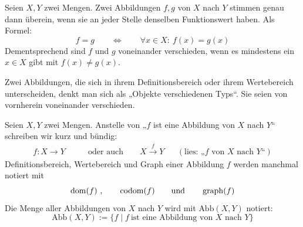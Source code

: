 \begin{axiom} \label{abbgleich}
    Seien $X,Y$ zwei Mengen. Zwei Abbildungen $f,g$ von $X$ nach $Y$ stimmen genau dann überein, wenn sie an jeder Stelle denselben Funktionswert haben. Als Formel:
        \[ f=g \qquad\Leftrightarrow\qquad \forall x\in X:\ f(x)=g(x) \]
    Dementsprechend sind $f$ und $g$ voneinander verschieden, wenn es mindestens ein $x\in X$ gibt mit $f(x)\neq g(x)$.
    
    Zwei Abbildungen, die sich in ihrem Definitionsbereich oder ihrem Wertebereich unterscheiden, denkt man sich als „Objekte verschiedenen Typs“. Sie seien von vornherein voneinander verschieden.
\end{axiom}


\begin{nota}
    Seien $X,Y$ zwei Mengen.
    Anstelle von „$f$ ist eine Abbildung von $X$ nach $Y$“ schreiben wir kurz und bündig:
    \begin{align*}
        f:X \to Y \qquad & \text{oder auch}\qquad X\xrightarrow{f} Y && (\text{lies: „$f$ von $X$ nach $Y$“})
    \end{align*}
    Definitionsbereich, Wertebereich und Graph einer Abbildung $f$ werden manchmal notiert mit
        \[ \operatorname{dom}(f)\ , \qquad \operatorname{codom}(f) \qquad\text{und}\qquad \operatorname{graph}(f)\]
    Die Menge aller Abbildungen von $X$ nach $Y$ wird mit $\text{Abb}(X,Y)$ notiert:
        \[ \text{Abb}(X,Y) := \{ f \mid f\ \text{ist eine Abbildung von $X$ nach $Y$} \} \]
\end{nota}


